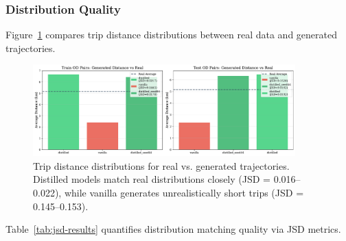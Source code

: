 \subsubsection{Distribution Quality}

Figure~\ref{fig:distance-distributions} compares trip distance distributions between real data and generated trajectories.

\begin{figure}[h]
    \centering
    \includegraphics[width=0.9\textwidth]{assets/plots/hoser/distance_distributions.pdf}
    \caption{Trip distance distributions for real vs. generated trajectories. Distilled models match real distributions closely (JSD = 0.016--0.022), while vanilla generates unrealistically short trips (JSD = 0.145--0.153).}
    \label{fig:distance-distributions}
\end{figure}

Table~\ref{tab:jsd-results} quantifies distribution matching quality via JSD metrics.

